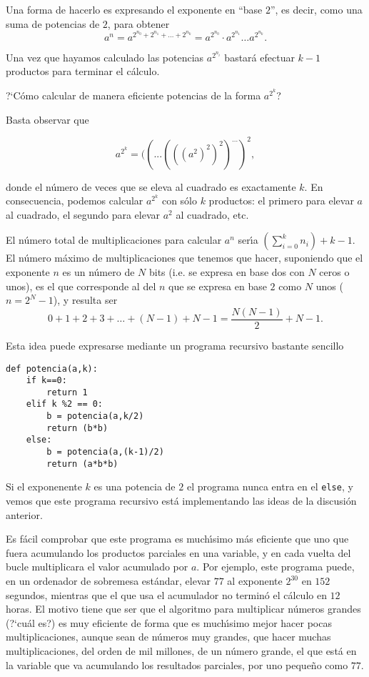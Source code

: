 Una forma de hacerlo es expresando el exponente en ``base $2$'', es decir, como
una suma de potencias de $2$, para obtener 
\[a^n=a^{2^{n_0}+2^{n_1}+\dots+2^{n_k}}=a^{2^{n_0}}\cdot a^{2^{n_1}}\dots
a^{2^{n_k}}.\]

Una vez que hayamos calculado las potencias $a^{2^{n_i}}$ bastar\'a efectuar
$k-1$ productos para terminar el c\'alculo.

?`C\'omo calcular de manera eficiente potencias de la forma $a^{2^{k}}$? 

Basta observar que 

\[a^{2^{k}}=((...(((a^2)^2)^2)^{\dots})^2,\]

\noindent donde el n\'umero de veces que se eleva al cuadrado es exactamente
$k.$  En consecuencia, podemos calcular $a^{2^{k}}$ con s\'olo $k$ productos: el
primero para elevar $a$ al cuadrado, el segundo para elevar $a^2$ al cuadrado, 
etc.

El n\'umero total de multiplicaciones para calcular $a^n$ ser\'{\i}a
$(\sum\limits_{i=0}^{k} n_i)+k-1$. El n\'umero m\'aximo de multiplicaciones que
tenemos que hacer, suponiendo  que el exponente $n$ es un n\'umero de $N$ bits
(i.e. se expresa en base dos con $N$ ceros o unos), es el que corresponde al del
$n$
que se expresa en base $2$ como $N$ unos ($n= 2^N-1$), y resulta ser  
\[0+1+2+3+\dots +(N-1)+N-1=\frac{N(N-1)}{2}+N-1.\]

Esta idea puede expresarse mediante un programa recursivo bastante sencillo

\begin{lstlisting}[columns=spaceflexible]
def potencia(a,k):
    if k==0:
        return 1
    elif k %2 == 0:
        b = potencia(a,k/2)
        return (b*b)
    else:
        b = potencia(a,(k-1)/2)
        return (a*b*b)
\end{lstlisting}
\label{potencias}

Si el exponenente $k$ es una potencia de $2$ el programa nunca entra en el
\lstinline|else|, y vemos que este programa recursivo est\'a
implementando las ideas de la discusi\'on anterior. 

Es f\'acil comprobar que este programa es much\'{\i}simo m\'as eficiente que uno
que fuera acumulando los productos parciales en una variable, y en cada vuelta
del bucle multiplicara el valor acumulado por $a$. Por ejemplo, este programa
puede, en un ordenador de sobremesa est\'andar, elevar $77$ al exponente
$2^{30}$ en $152$ segundos, mientras que el que usa el acumulador no termin\'o
el
c\'alculo en $12$ horas. El motivo tiene que ser que el algoritmo para
multiplicar n\'umeros grandes (?`cu\'al es?) es muy eficiente de forma que es
much\'{\i}simo  mejor hacer pocas multiplicaciones, aunque sean de n\'umeros muy
grandes, que hacer muchas multiplicaciones, del orden de mil millones, de un
n\'umero grande, el que est\'a en la variable que va acumulando los resultados
parciales, por uno  peque\~no como $77$.


